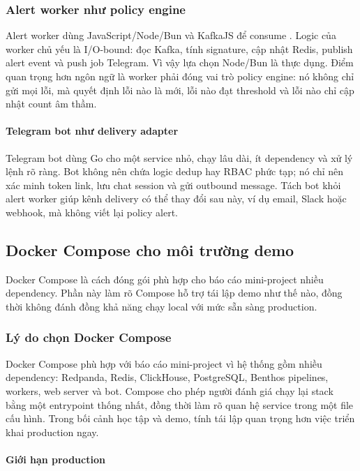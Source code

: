 \subsubsection{Alert worker như policy engine}

Alert worker dùng JavaScript/Node/Bun và KafkaJS để consume . Logic của worker chủ yếu là I/O-bound: đọc Kafka, tính signature, cập nhật Redis, publish alert event và push job Telegram. Vì vậy lựa chọn Node/Bun là thực dụng. Điểm quan trọng hơn ngôn ngữ là worker phải đóng vai trò policy engine: nó không chỉ gửi mọi lỗi, mà quyết định lỗi nào là mới, lỗi nào đạt threshold và lỗi nào chỉ cập nhật count âm thầm.

\paragraph{Telegram bot như delivery adapter}

Telegram bot dùng Go cho một service nhỏ, chạy lâu dài, ít dependency và xử lý lệnh rõ ràng. Bot không nên chứa logic dedup hay RBAC phức tạp; nó chỉ nên xác minh token link, lưu chat session và gửi outbound message. Tách bot khỏi alert worker giúp kênh delivery có thể thay đổi sau này, ví dụ email, Slack hoặc webhook, mà không viết lại policy alert.

\subsection{Docker Compose cho môi trường demo}

Docker Compose là cách đóng gói phù hợp cho báo cáo mini-project nhiều dependency. Phần này làm rõ Compose hỗ trợ tái lập demo như thế nào, đồng thời không đánh đồng khả năng chạy local với mức sẵn sàng production.

\subsubsection{Lý do chọn Docker Compose}

Docker Compose phù hợp với báo cáo mini-project vì hệ thống gồm nhiều dependency: Redpanda, Redis, ClickHouse, PostgreSQL, Benthos pipelines, workers, web server và bot. Compose cho phép người đánh giá chạy lại stack bằng một entrypoint thống nhất, đồng thời làm rõ quan hệ service trong một file cấu hình. Trong bối cảnh học tập và demo, tính tái lập quan trọng hơn việc triển khai production ngay.

\paragraph{Giới hạn production}


